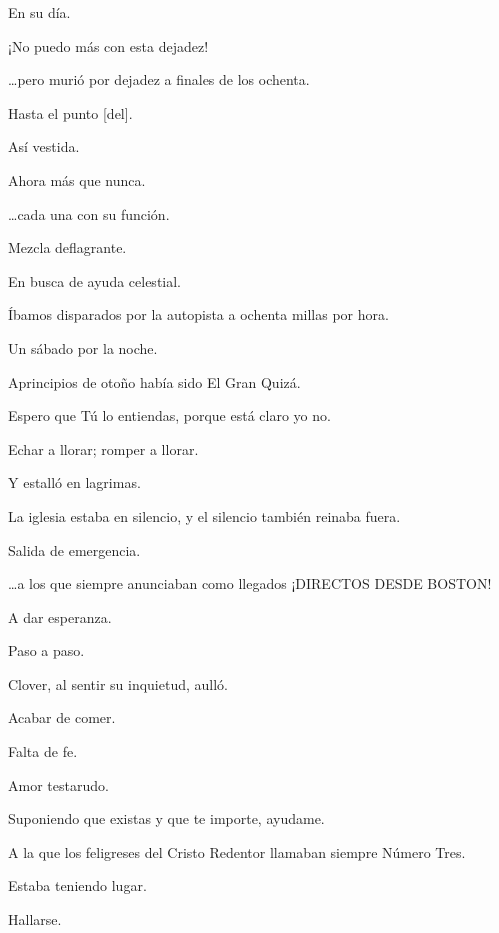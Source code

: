 \sk
En su día. 

\sk
¡No puedo más con esta dejadez!

\sk
\ldots{}pero murió por dejadez a finales de los ochenta.  

\sk
Hasta el punto [del]. 

\sk
Así vestida. 

\sk
Ahora más que nunca. 

\sk
\ldots{}cada una con su función.

\sk
Mezcla deflagrante. 

\sk
En busca de ayuda celestial.

\sk
Íbamos disparados por la autopista a ochenta millas por hora.

\sk
Un sábado por la noche.

\sk
Aprincipios de otoño había sido El Gran Quizá. 

\sk
Espero que Tú lo entiendas, porque está claro yo no.

\sk
Echar a llorar; romper a llorar. 

\sk
Y estalló en lagrimas. 

\sk
La iglesia estaba en silencio, y el silencio también reinaba fuera.

\sk
Salida de emergencia. 

\sk
\ldots{}a los que siempre anunciaban como llegados ¡DIRECTOS DESDE BOSTON!

\sk
A dar esperanza. 

\sk
Paso a paso. 

\sk
Clover, al sentir su inquietud, aulló. 

\sk
Acabar de comer.

\sk
Falta de fe. 

\sk
Amor testarudo. 

\sk
Suponiendo que existas y que te importe, ayudame.

\sk
A la que los feligreses del Cristo Redentor llamaban siempre Número Tres.

\sk
Estaba teniendo lugar. 

\sk
Hallarse. 

